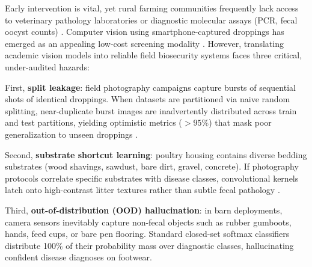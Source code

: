 \documentclass[conference]{IEEEtran}
\begin{document}
Early intervention is vital, yet rural farming communities frequently lack access to veterinary pathology laboratories or diagnostic molecular assays (PCR, fecal oocyst counts) \cite{machuve2022poultry, adeyemo2021poultry}. Computer vision using smartphone-captured droppings has emerged as an appealing low-cost screening modality \cite{machuve2022poultry, owomugisha2021machine, zhuang2018automated}. However, translating academic vision models into reliable field biosecurity systems faces three critical, under-audited hazards:

First, \textbf{split leakage}: field photography campaigns capture bursts of sequential shots of identical droppings. When datasets are partitioned via naive random splitting, near-duplicate burst images are inadvertently distributed across train and test partitions, yielding optimistic metrics ($>95\%$) that mask poor generalization to unseen droppings \cite{petchiammal2023paddy, barbedo2018factors}.

Second, \textbf{substrate shortcut learning}: poultry housing contains diverse bedding substrates (wood shavings, sawdust, bare dirt, gravel, concrete). If photography protocols correlate specific substrates with disease classes, convolutional kernels latch onto high-contrast litter textures rather than subtle fecal pathology \cite{geirhos2020shortcut, lapuschkin2019unmasking}.

Third, \textbf{out-of-distribution (OOD) hallucination}: in barn deployments, camera sensors inevitably capture non-fecal objects such as rubber gumboots, hands, feed cups, or bare pen flooring. Standard closed-set softmax classifiers distribute 100\% of their probability mass over diagnostic classes, hallucinating confident disease diagnoses on footwear.
\end{document}
